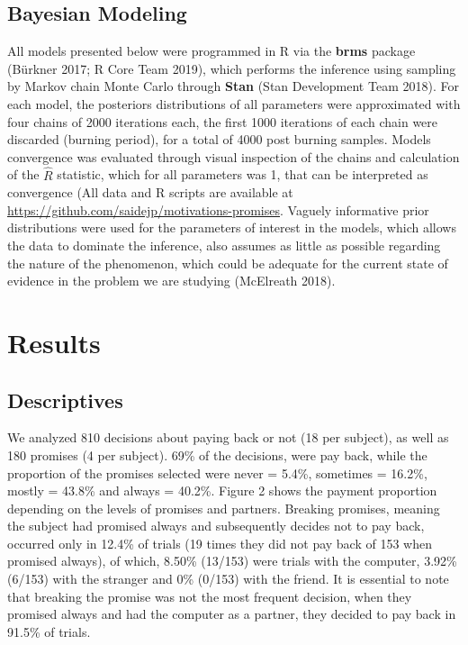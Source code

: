 \documentclass[smallextended]{svjour3}       %
\begin{document}
\hypertarget{bayesian-modeling}{%
\subsection{Bayesian Modeling}\label{bayesian-modeling}}

All models presented below were programmed in R via the \textbf{brms}
package (Bürkner 2017; R Core Team 2019), which performs the inference
using sampling by Markov chain Monte Carlo through \textbf{Stan} (Stan
Development Team 2018). For each model, the posteriors distributions of
all parameters were approximated with four chains of 2000 iterations
each, the first 1000 iterations of each chain were discarded (burning
period), for a total of 4000 post burning samples. Models convergence
was evaluated through visual inspection of the chains and calculation of
the \(\hat{R}\) statistic, which for all parameters was 1, that can be
interpreted as convergence (All data and R scripts are available at 
\url{https://github.com/saidejp/motivations-promises}. Vaguely informative 
prior distributions were used for the parameters of interest in 
the models, which allows the data to dominate the inference, also assumes as
little as possible regarding the nature of the phenomenon, which could be 
adequate for the current state of evidence in the problem 
we are studying (McElreath 2018).

\hypertarget{results}{%
\section{Results}\label{results}}

\hypertarget{descriptives}{%
\subsection{Descriptives}\label{descriptives}}

We analyzed 810 decisions about paying back or not (18 per subject), as
well as 180 promises (4 per subject). 69\% of the decisions, were pay
back, while the proportion of the promises selected were never = 5.4\%,
sometimes = 16.2\%, mostly = 43.8\% and always = 40.2\%. Figure 2 shows
the payment proportion depending on the levels of promises and partners.
Breaking promises, meaning the subject had promised always and
subsequently decides not to pay back, occurred only in 12.4\% of trials
(19 times they did not pay back of 153 when promised always), of which,
8.50\% (13/153) were trials with the computer, 3.92\% (6/153) with the
stranger and 0\% (0/153) with the friend. It is essential to note that
breaking the promise was not the most frequent decision, when they
promised always and had the computer as a partner, they decided to pay
back in 91.5\% of trials.
\end{document}
